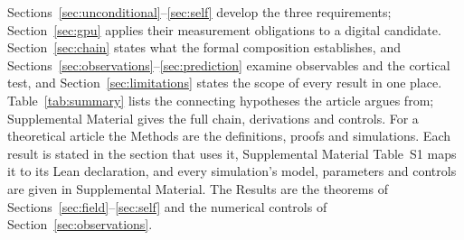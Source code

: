 \documentclass[12pt]{article}
\begin{document}
Sections~\ref{sec:unconditional}--\ref{sec:self} develop the three requirements;
Section~\ref{sec:gpu} applies their measurement obligations to a digital
candidate. Section~\ref{sec:chain} states what the formal composition
establishes, and Sections~\ref{sec:observations}--\ref{sec:prediction} examine
observables and the cortical test, and Section~\ref{sec:limitations} states the
scope of every result in one place. Table~\ref{tab:summary} lists the connecting
hypotheses the article argues from; Supplemental Material gives the full chain,
derivations and controls. For a theoretical article the Methods are the
definitions, proofs and simulations. Each result is stated in the section that
uses it, Supplemental Material Table~S1 maps it to its Lean declaration, and
every simulation's model, parameters and controls are given in Supplemental
Material. The Results are the theorems of
Sections~\ref{sec:field}--\ref{sec:self} and the numerical controls of
Section~\ref{sec:observations}.
\end{document}
